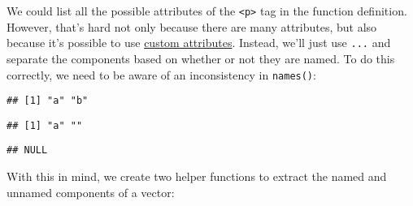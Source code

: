 We could list all the possible attributes of the
\texttt{\textless{}p\textgreater{}} tag in the function definition.
However, that's hard not only because there are many attributes, but
also because it's possible to use
\href{http://html5doctor.com/html5-custom-data-attributes/}{custom
attributes}. Instead, we'll just use \texttt{...} and separate the
components based on whether or not they are named. To do this correctly,
we need to be aware of an inconsistency in \texttt{names()}:

\begin{Shaded}
\begin{Highlighting}[]
\NormalTok{(}\NormalTok{(} \NormalTok{, } \NormalTok{))}
\end{Highlighting}
\end{Shaded}

\begin{verbatim}
## [1] "a" "b"
\end{verbatim}

\begin{Shaded}
\begin{Highlighting}[]
\NormalTok{(}\NormalTok{(} \NormalTok{, }\NormalTok{))}
\end{Highlighting}
\end{Shaded}

\begin{verbatim}
## [1] "a" ""
\end{verbatim}

\begin{Shaded}
\begin{Highlighting}[]
\NormalTok{(}\NormalTok{(}\NormalTok{, }\NormalTok{))}
\end{Highlighting}
\end{Shaded}

\begin{verbatim}
## NULL
\end{verbatim}

With this in mind, we create two helper functions to extract the named
and unnamed components of a vector:

\begin{Shaded}
\begin{Highlighting}[]
\StringTok{ }
  \NormalTok{ (}\NormalTok{(}\NormalTok{(}\NormalTok{)}
\NormalTok{  x[}\OperatorTok{!=}\NormalTok{]}
\NormalTok{\}}
\StringTok{ }
  \NormalTok{ (}\NormalTok{(}
\NormalTok{  x[}\OperatorTok{==}\NormalTok{]}
\NormalTok{\}}
\end{Highlighting}
\end{Shaded}

